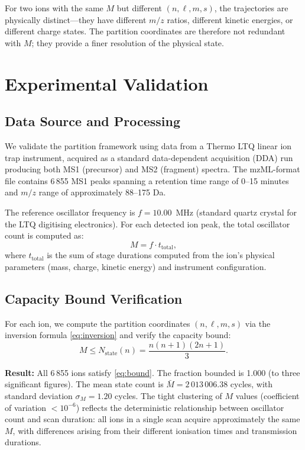 \documentclass[twocolumn,10pt]{article}
\newcommand{\Nstate}{N_{\mathrm{state}}}
\begin{document}
For two ions with the same $M$ but different $(n, \ell, m, s)$, the trajectories are physically distinct---they have different $m/z$ ratios, different kinetic energies, or different charge states. The partition coordinates are therefore not redundant with $M$; they provide a finer resolution of the physical state.

\section{Experimental Validation}
\label{sec:experiment}

\subsection{Data Source and Processing}

We validate the partition framework using data from a Thermo LTQ linear ion trap instrument, acquired as a standard data-dependent acquisition (DDA) run producing both MS1 (precursor) and MS2 (fragment) spectra. The mzML-format file contains 6\,855 MS1 peaks spanning a retention time range of 0--15 minutes and $m/z$ range of approximately 88--175 Da.

The reference oscillator frequency is $f = 10.00$~MHz (standard quartz crystal for the LTQ digitising electronics). For each detected ion peak, the total oscillator count is computed as:
\begin{equation}
    M = f \cdot t_{\mathrm{total}},
\end{equation}
where $t_{\mathrm{total}}$ is the sum of stage durations computed from the ion's physical parameters (mass, charge, kinetic energy) and instrument configuration.

\subsection{Capacity Bound Verification}

For each ion, we compute the partition coordinates $(n, \ell, m, s)$ via the inversion formula \eqref{eq:inversion} and verify the capacity bound:
\begin{equation}
    M \leq \Nstate(n) = \frac{n(n+1)(2n+1)}{3}.
    \label{eq:bound}
\end{equation}

\textbf{Result:} All 6\,855 ions satisfy \eqref{eq:bound}. The fraction bounded is 1.000 (to three significant figures). The mean state count is $\bar{M} = 2\,013\,006.38$ cycles, with standard deviation $\sigma_M = 1.20$ cycles. The tight clustering of $M$ values (coefficient of variation $< 10^{-6}$) reflects the deterministic relationship between oscillator count and scan duration: all ions in a single scan acquire approximately the same $M$, with differences arising from their different ionisation times and transmission durations.
\end{document}
